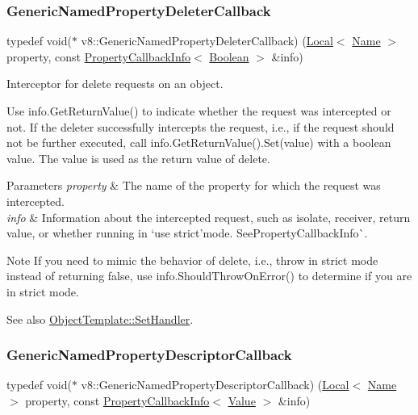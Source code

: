 \subsubsection{\texorpdfstring{Generic\+Named\+Property\+Deleter\+Callback}{GenericNamedPropertyDeleterCallback}}
{\footnotesize\ttfamily typedef void($\ast$ v8\+::\+Generic\+Named\+Property\+Deleter\+Callback) (\mbox{\hyperlink{classv8_1_1Local}{Local}}$<$ \mbox{\hyperlink{classv8_1_1Name}{Name}} $>$ property, const \mbox{\hyperlink{classv8_1_1PropertyCallbackInfo}{Property\+Callback\+Info}}$<$ \mbox{\hyperlink{classv8_1_1Boolean}{Boolean}} $>$ \&info)}

Interceptor for delete requests on an object.

Use {\ttfamily info.\+Get\+Return\+Value()} to indicate whether the request was intercepted or not. If the deleter successfully intercepts the request, i.\+e., if the request should not be further executed, call {\ttfamily info.\+Get\+Return\+Value().Set(value)} with a boolean {\ttfamily value}. The {\ttfamily value} is used as the return value of {\ttfamily delete}.


\begin{DoxyParams}{Parameters}
{\em property} & The name of the property for which the request was intercepted. \\
\hline
{\em info} & Information about the intercepted request, such as isolate, receiver, return value, or whether running in `\textquotesingle{}use strict'{\ttfamily mode. See}Property\+Callback\+Info\`{}.\\
\hline
\end{DoxyParams}
\begin{DoxyNote}{Note}
If you need to mimic the behavior of {\ttfamily delete}, i.\+e., throw in strict mode instead of returning false, use {\ttfamily info.\+Should\+Throw\+On\+Error()} to determine if you are in strict mode.
\end{DoxyNote}
See also {\ttfamily \mbox{\hyperlink{classv8_1_1ObjectTemplate_a3d5666f1e9b0f46df6b4dbb7cfbb6114}{Object\+Template\+::\+Set\+Handler}}.} \mbox{\label{namespacev8_a8cf8faa26baffa84173a24906c0d49f6}} 
\subsubsection{\texorpdfstring{Generic\+Named\+Property\+Descriptor\+Callback}{GenericNamedPropertyDescriptorCallback}}
{\footnotesize\ttfamily typedef void($\ast$ v8\+::\+Generic\+Named\+Property\+Descriptor\+Callback) (\mbox{\hyperlink{classv8_1_1Local}{Local}}$<$ \mbox{\hyperlink{classv8_1_1Name}{Name}} $>$ property, const \mbox{\hyperlink{classv8_1_1PropertyCallbackInfo}{Property\+Callback\+Info}}$<$ \mbox{\hyperlink{classv8_1_1Value}{Value}} $>$ \&info)}

